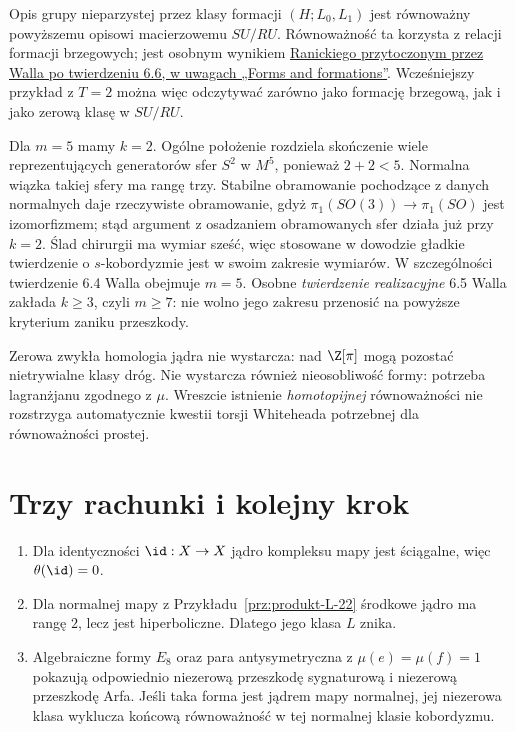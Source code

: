 Opis grupy nieparzystej przez klasy formacji
$(H;L_0,L_1)$ jest równoważny powyższemu
opisowi macierzowemu $SU/RU$. Równoważność
ta korzysta z relacji formacji brzegowych;
jest osobnym wynikiem
\href{https://www.maths.ed.ac.uk/~v1ranick/books/scm.pdf}
{Ranickiego przytoczonym przez Walla po
twierdzeniu 6.6, w uwagach „Forms and formations”}.
Wcześniejszy przykład z $T=2$ można więc
odczytywać zarówno jako formację brzegową,
jak i jako zerową klasę w $SU/RU$.

\begin{uwaga}
\label{uwaga:wall-odd-five-22}
Dla $m=5$ mamy $k=2$. Ogólne położenie
rozdziela skończenie wiele reprezentujących
generatorów sfer $S^2$ w $M^5$, ponieważ
$2+2<5$. Normalna wiązka takiej sfery ma
rangę trzy. Stabilne obramowanie pochodzące
z danych normalnych daje rzeczywiste
obramowanie, gdyż
$\pi_1(SO(3))\to\pi_1(SO)$ jest izomorfizmem;
stąd argument z osadzaniem obramowanych
sfer działa już przy $k=2$. Ślad chirurgii
ma wymiar sześć, więc stosowane w dowodzie
gładkie twierdzenie o $s$-kobordyzmie jest
w swoim zakresie wymiarów. W szczególności
twierdzenie 6.4 Walla obejmuje $m=5$.
Osobne \emph{twierdzenie realizacyjne} 6.5
Walla zakłada $k\geq3$, czyli $m\geq7$:
nie wolno jego zakresu przenosić na
powyższe kryterium zaniku przeszkody.
\end{uwaga}

\begin{uwaga}
\label{uwaga:homologia-L-22}
Zerowa zwykła homologia jądra nie wystarcza:
nad $\Z[\pi]$ mogą pozostać nietrywialne
klasy dróg. Nie wystarcza również nieosobliwość
formy: potrzeba lagranżjanu zgodnego z $\mu$.
Wreszcie istnienie \emph{homotopijnej}
równoważności nie rozstrzyga automatycznie
kwestii torsji Whiteheada potrzebnej dla
równoważności prostej.
\end{uwaga}

\section{Trzy rachunki i kolejny krok}
\label{sec:przyklady-L-22}

\begin{enumerate}[label=(\arabic*)]
\item Dla identyczności $\id:X\to X$ jądro
kompleksu mapy jest ściągalne, więc
$\theta(\id)=0$.
\item Dla normalnej mapy z
Przykładu~\ref{prz:produkt-L-22} środkowe
jądro ma rangę $2$, lecz jest hiperboliczne.
Dlatego jego klasa $L$ znika.
\item Algebraiczne formy $E_8$ oraz para
antysymetryczna z $\mu(e)=\mu(f)=1$
pokazują odpowiednio niezerową przeszkodę
sygnaturową i niezerową przeszkodę Arfa.
Jeśli taka forma jest jądrem mapy normalnej,
jej niezerowa klasa wyklucza końcową
równoważność w tej normalnej klasie kobordyzmu.
\end{enumerate}

